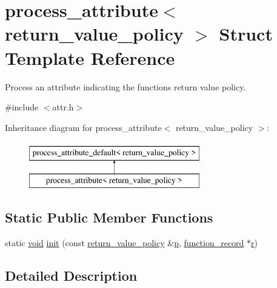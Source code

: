 \hypertarget{structprocess__attribute_3_01return__value__policy_01_4}{}\section{process\+\_\+attribute$<$ return\+\_\+value\+\_\+policy $>$ Struct Template Reference}
\label{structprocess__attribute_3_01return__value__policy_01_4}


Process an attribute indicating the function\textquotesingle{}s return value policy.  




{\ttfamily \#include $<$attr.\+h$>$}

Inheritance diagram for process\+\_\+attribute$<$ return\+\_\+value\+\_\+policy $>$\+:\begin{figure}[H]
\begin{center}
\leavevmode
\includegraphics[height=2.000000cm]{structprocess__attribute_3_01return__value__policy_01_4}
\end{center}
\end{figure}
\subsection*{Static Public Member Functions}
\begin{DoxyCompactItemize}
\item 
static \mbox{\hyperlink{_s_d_l__opengles2__gl2ext_8h_ae5d8fa23ad07c48bb609509eae494c95}{void}} \mbox{\hyperlink{structprocess__attribute_3_01return__value__policy_01_4_a2e7b34a8067d2365b0b6ded2745c1134}{init}} (const \mbox{\hyperlink{detail_2common_8h_adde72ab1fb0dd4b48a5232c349a53841}{return\+\_\+value\+\_\+policy}} \&\mbox{\hyperlink{_s_d_l__opengl__glext_8h_aa5367c14d90f462230c2611b81b41d23}{p}}, \mbox{\hyperlink{structfunction__record}{function\+\_\+record}} $\ast$\mbox{\hyperlink{_s_d_l__opengl_8h_a42ce7cdc612e53abee15043f80220d97}{r}})
\end{DoxyCompactItemize}


\subsection{Detailed Description}
